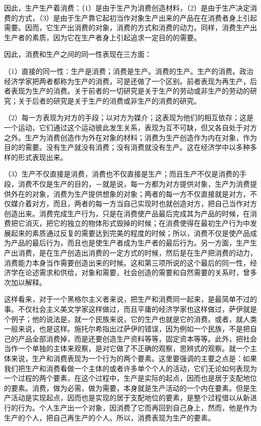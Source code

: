 \documentclass[a4paper,twoside,12pt,AutoFakeBold]{ctexart}
\begin{document}
因此，生产生产着消费：（1）是由于生产为消费创造材料，（2）是由于生产决定消费的方式，（3）是由于生产靠它起初当作对象生产出来的产品在在消费者身上引起需要。因而，它生产出消费的对象，消费的方式和消费的动力。同样，消费生产出生产者的素质，因为它在生产者身上引起追求一定目的的需要。

因此，消费和生产之间的同一性表现在三方面：

（1）直接的同一性：生产是消费；消费是生产。消费的生产。生产的消费。政治经济学家把两者都称为生产的消费，可是还做了一个区别。前者表现为再生产，后者表现为生产的消费。关于前者的一切研究是关于生产的劳动或非生产的劳动的研究；关于后者的研究是关于生产的消费或非生产的消费的研究。

（2）每一方表现为对方的手段；以对方为媒介；这表现为他们的相互依存；这是一个运动，它们通过这个运动彼此发生关系，表现为互不可缺，但又各自处于对方之外。生产为消费创造作为外在对象的材料；消费为生产创造作为内在对象，作为目的的需要。没有生产就没有消费；没有消费就没有生产。这在经济学中以多种多样的形式表现出来。

（3）生产不仅直接是消费，消费也不仅直接是生产；而且生产不仅是消费的手段，消费不仅是生产的目的，－就是说，每一方都为对方提供对象，生产为消费提供外在的对象，消费为生产提供想象的对象；两者的每一方不仅直接就是对方，不仅媒介着对方，而且，两者的每一方当自己实现时也就创造对方，把自己当作对方创造出来。消费完成生产行为，只是在消费使产品最后完成其为产品的时候，在消费把它消灭，把它的独立的物体形式毁掉的时候；在消费使得在最初生产行为中发展起来的素质通过反复的需要达到完美的程度的时候；所以，消费不仅是使产品成为产品的最后行为，而且也是使生产者成为生产者的最后行为。另一方面，生产生产出消费，是在生产创造出消费的一定方式的时候，然后是在生产把消费的动力，消费能力本身当作需要创造出来的时候。这和第三项所说的这个最后的同一性，经济学在论述需求和供给，对象和需要，社会创造的需要和自然需要的关系时，曾多次加以解释。

这样看来，对于一个黑格尔主义者来说，把生产和消费同一起来，是最简单不过的事。不仅社会主义美文学家这样做过，而且平庸的经济学家也这样做过，萨伊就是个例子；他的说法是，就一个民族来说，它的生产也就是它的消费。或者，就人类一般来说，也是这样。施托尔希指出过萨伊的错误，因为例如一个民族，不是把自己的产品全部消费掉，而是还要创造生产资料等等，固定资本等等。此外，把社会当作一个单独的主体来观察，是对它做了不正确的观察，思辨式的观察。就一个主体来说，生产和消费表现为一个行为的两个要素。这里要强调的主要之点是：如果我们把生产和消费看做一个主体的或者许多单个个人的活动，它们无论如何表现为一个过程的两个要素，在这个过程中，生产是实际的起点，因而也是居于支配地位的要素。消费，做为必需，做为需要，本身就是生产活动的一个内在要素。但是生产活动是实现起点，因而也是实现的居于支配地位的要素，是整个过程借以从新进行的行为。个人生产出一个对象，因消费了它而再回到自己身上，然而，他是作为生产的个人，把自己再生产的个人。所以，消费表现为生产的要素。
\end{document}
